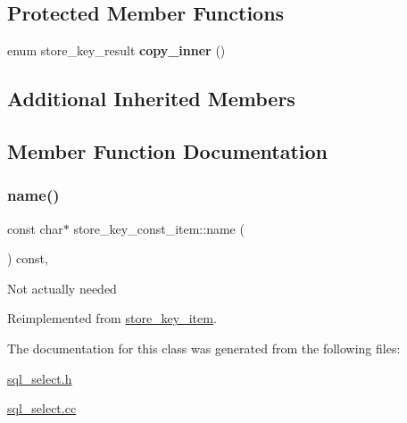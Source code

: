 \subsection*{Protected Member Functions}
\begin{DoxyCompactItemize}
\item 
\mbox{\label{classstore__key__const__item_a5a2ff5d4fbfbcfb7ae4f7bdf915b8bee}} 
enum store\+\_\+key\+\_\+result {\bfseries copy\+\_\+inner} ()
\end{DoxyCompactItemize}
\subsection*{Additional Inherited Members}


\subsection{Member Function Documentation}
\mbox{\label{classstore__key__const__item_a1c578851203067d4ab3c90b81d7b3cfa}} 
\subsubsection{\texorpdfstring{name()}{name()}}
{\footnotesize\ttfamily const char$\ast$ store\+\_\+key\+\_\+const\+\_\+item\+::name (\begin{DoxyParamCaption}{ }\end{DoxyParamCaption}) const\hspace{0.3cm}{\ttfamily [inline]}, {\ttfamily [virtual]}}

Not actually needed 

Reimplemented from \mbox{\hyperlink{classstore__key__item_a88e2baa208896dcde9ba66e9715efc3c}{store\+\_\+key\+\_\+item}}.



The documentation for this class was generated from the following files\+:\begin{DoxyCompactItemize}
\item 
\mbox{\hyperlink{sql__select_8h}{sql\+\_\+select.\+h}}\item 
\mbox{\hyperlink{sql__select_8cc}{sql\+\_\+select.\+cc}}\end{DoxyCompactItemize}
